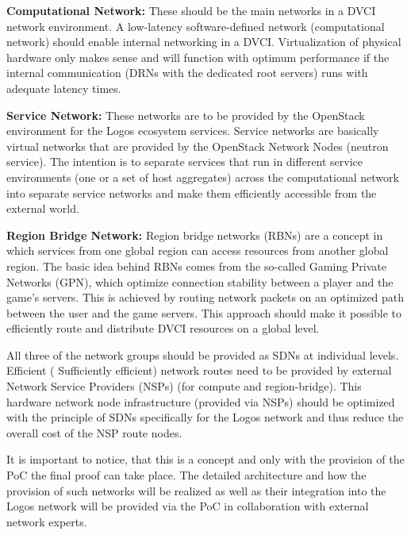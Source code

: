 \documentclass[]{article}
\begin{document}
\textbf{Computational Network:}
These should be the main networks in a DVCI network environment.  
A low-latency software-defined network (computational network) should enable internal networking in a DVCI.  
Virtualization of physical hardware only makes sense and will function with optimum performance if the internal communication (DRNs with the dedicated root servers) runs with adequate latency times.
\newline

\textbf{Service Network:}
These networks are to be provided by the OpenStack environment for the Logos ecosystem services. 
Service networks are basically virtual networks that are provided by the OpenStack Network Nodes (neutron service). 
The intention is to separate services that run in different service environments (one or a set of host aggregates) across the computational network into separate service networks and make them efficiently accessible from the external world.
\newline

\textbf{Region Bridge Network:}
Region bridge networks (RBNs) are a concept in which services from one global region can access resources from another global region.
The basic idea behind RBNs comes from the so-called Gaming Private Networks (GPN), which optimize connection stability between a player and the game's servers. 
This is achieved by routing network packets on an optimized path between the user and the game servers.
This approach should make it possible to efficiently route and distribute DVCI resources on a global level.
\newline

All three of the network groups should be provided as SDNs at individual levels. 
Efficient ( Sufficiently efficient) network routes need to be provided by external Network Service Providers (NSPs) (for compute and region-bridge). 
This hardware network node infrastructure (provided via NSPs) should be optimized with the principle of SDNs specifically for the Logos network and thus reduce the overall cost of the NSP route nodes.  

It is important to notice, that this is a concept and only with the provision of the PoC the final proof can take place.
The detailed architecture and how the provision of such networks will be realized as well as their integration into the Logos network will be provided via the PoC in collaboration with external network experts.
\end{document}
